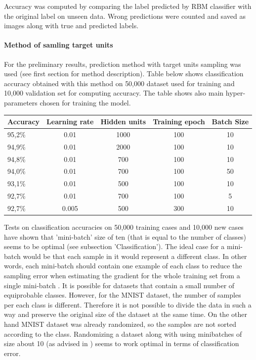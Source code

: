 \documentclass[a4paper]{scrartcl}
\begin{document}
\par Accuracy was computed by comparing the label predicted by RBM classifier with the original label on unseen data. Wrong predictions were counted and saved as images along with true and predicted labels. 
\paragraph{Method of samling target units} For the preliminary results, prediction method with target units sampling was used (see first section for method description). Table below shows classification accuracy obtained with this method on 50,000 dataset used for training and 10,000 validation set for computing accuracy. The table shows also main hyper-parameters chosen for training the model.
\begin{center}
\hspace{1cm}
\begin{tabular}{|l||c|c|c|c|} \hline
Accuracy & Learning rate & Hidden units & Training epoch & Batch Size
\\ \hline
95,2\% & 0.01 & 1000 & 100 & 10
\\ \hline
94,9\% & 0.01 & 2000 & 100 & 10
\\ \hline
94,8\% & 0.01 & 700 & 100 & 10
\\ \hline
94,0\% & 0.01 & 700 & 100 & 50
\\ \hline
93,1\% & 0.01 & 500 & 100 & 10
\\ \hline
92,7\% & 0.01 & 700 & 100 & 5
\\ \hline
92,7\% & 0.005 & 500 & 300 & 10
\\ \hline \end{tabular}
\end{center}
Tests on classification accuracies on 50,000 training cases and 10,000 new cases have shown that 'mini-batch' size of ten (that is equal to the number of classes) seems to be optimal (see subsection 'Classification'). The ideal case for a mini-batch would be that each sample in it would represent a different class. In other words, each mini-batch should contain one example of each class to reduce the sampling error when estimating the gradient for the whole training set from a single mini-batch \cite{Hinton}. It is possible for datasets that contain a small number of equiprobable classes. However, for the MNIST dataset, the number of samples per each class is different. Therefore it is not possible to divide the data in such a way and preserve the original size of the dataset at the same time. On the other hand MNIST dataset was already randomized, so the samples are not sorted according to the class. Randomizing a dataset along with using minibatches of size about 10 (as advised in \cite{Hinton}) seems to work optimal in terms of classification error.
\end{document}
